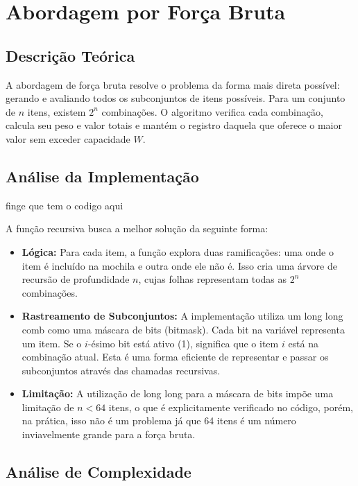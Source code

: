 \documentclass[12pt, a4paper]{article}
\begin{document}
\section{Abordagem por Força Bruta}

\subsection{Descrição Teórica}

\indent A abordagem de força bruta resolve o problema da forma mais direta possível: gerando e avaliando todos os subconjuntos de itens possíveis. Para um conjunto de $n$ itens, existem $2^n$ combinações. O algoritmo verifica cada combinação, calcula seu peso e valor totais e mantém o registro daquela que oferece o maior valor sem exceder capacidade $W$.

\subsection{Análise da Implementação}

finge que tem o codigo aqui

\indent A função recursiva busca a melhor solução da seguinte forma:

\begin{itemize}
    \item \textbf{Lógica:} Para cada item, a função explora duas ramificações: uma onde o item é incluído na mochila e outra onde ele não é. Isso cria uma árvore de recursão de profundidade $n$, cujas folhas representam todas as $2^n$ combinações.
    
    \item \textbf{Rastreamento de Subconjuntos:} A implementação utiliza um long long comb como uma máscara de bits (bitmask). Cada bit na variável representa um item. Se o $i$-ésimo bit está ativo (1), significa que o item $i$ está na combinação atual. Esta é uma forma eficiente de representar e passar os subconjuntos através das chamadas recursivas.
    
    \item \textbf{Limitação:} A utilização de long long para a máscara de bits impõe uma limitação de $n \lt 64$ itens, o que é explicitamente verificado no código, porém, na prática, isso não é um problema já que 64 itens é um número inviavelmente grande para a força bruta.
\end{itemize}

\subsection{Análise de Complexidade}
\end{document}
